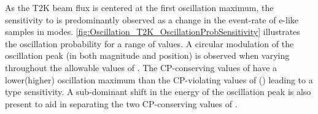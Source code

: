 As the T2K beam flux is centered at the first oscillation maximum, the sensitivity to \dcp is predominantly observed as a change in the event-rate of e-like samples in \quickmath{\nu/\bar{\nu}} modes. \autoref{fig:Oscillation_T2K_OscillationProbSensitivity} illustrates the  oscillation probability for a range of \dcp values. %
A circular modulation of the oscillation peak (in both magnitude and position) is observed when varying throughout the allowable values of \dcp. The CP-conserving values of  have a lower(higher) oscillation maximum than the CP-violating values of () leading to a  type sensitivity. A sub-dominant shift in the energy of the oscillation peak is also present to aid in separating the two CP-conserving values of \dcp.

